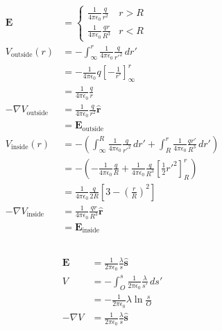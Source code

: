 \documentclass{article}
\renewcommand{\vec}[1]{\boldsymbol{\mathbf{#1}}}
\newcommand{\uvec}[1]{\hat{\vec{#1}}}
\newcommand{\ke}{\frac{1}{4 \pi \epsilon_0}}
\begin{document}
\begin{align*}
  \vec{E}                  & = \begin{cases}
                                 \ke \frac{q}{r^2}   & r > R \\
                                 \ke \frac{q r}{R^3} & r < R
                               \end{cases}                                                                    \\
  V_\text{outside}(r)      & = -\int_\infty^r \ke \frac{q}{r'^2} \,d r'                                                       \\
                           & = -\ke q \left[ -\frac{1}{r'} \right]_\infty^r                                                   \\
                           & = \ke \frac{q}{r}                                                                                \\
  -\nabla V_\text{outside} & = \ke \frac{q}{r^2} \uvec{r}                                                                     \\
                           & = \vec{E}_\text{outside}                                                                         \\
  V_\text{inside}(r)       & = -\left( \int_\infty^R \ke \frac{q}{r'^2} \,d r' + \int_R^r \ke \frac{q r'}{R^3} \,d r' \right) \\
                           & = -\left( -\ke \frac{q}{R} + \ke \frac{q}{R^3} \left[ \frac{1}{2} r'^2 \right]_R^r \right)       \\
                           & = \ke \frac{q}{2 R} \left[ 3 - \left( \frac{r}{R} \right)^2 \right]                              \\
  -\nabla V_\text{inside}  & = \ke \frac{q r}{R^3} \uvec{r}                                                                   \\
                           & = \vec{E}_\text{inside}
\end{align*}

\subsection{}

\begin{align*}
  \vec{E}   & = \frac{1}{2 \pi \epsilon_0} \frac{\lambda}{s} \uvec{s}          \\
  V         & = -\int_O^s \frac{1}{2 \pi \epsilon_0} \frac{\lambda}{s'} \,d s' \\
            & = -\frac{1}{2 \pi \epsilon_0} \lambda \ln \frac{s}{O}            \\
  -\nabla V & = \frac{1}{2 \pi \epsilon_0} \frac{\lambda}{s} \uvec{s}
\end{align*}
\end{document}
